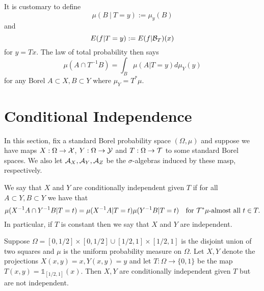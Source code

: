 \documentclass[twoside, a4paper, 10pt]{amsart}
\begin{document}
It is customary to define $$\mu(B ~|~ T = y) := \mu_y(B)$$ and $$E(f | T=y) := E(f|\mathcal{B}_T)(x)$$ for $y = Tx$. The law of total probability then says $$\mu(A \cap T^{-1}B) = \int_B \mu(A | T=y) d\mu_Y(y)  $$ for any Borel $A \subset X, B \subset Y$ where $\mu_Y = T^*\mu$.

\section{Conditional Independence}

In this section, fix a standard Borel probability space $(\Omega,\mu)$ and suppose we have maps $X:\Omega \to \mathcal{X}$, $Y:\Omega \to \mathcal{Y}$ and $T:\Omega \to \mathcal{T}$ to some standard Borel spaces. We also let $\mathcal{A}_X, \mathcal{A}_Y, \mathcal{A}_Z$ be the $\sigma$-algebras induced by these masp, respectively.

\begin{mydef} We say that $X$ and $Y$ are conditionally independent given $T$ if for all $A  \subset Y, B  \subset Y$ we have that $$\mu(X^{-1}A \cap Y^{-1}B |T=t) = \mu(X^{-1}A|T=t)\mu(Y^{-1}B|T=t) \quad\text{for $\mathcal{T}^*\mu$-almost all } t \in T.$$ In particular, if $T$ is constant then we say that $X$ and $Y$ are independent.

\end{mydef}

\begin{eg} Suppose $\Omega = [0,1/2] \times [0,1/2] \cup [1/2,1] \times [1/2,1]$ is the disjoint union of two squares and $\mu$ is the uniform probability measure on $\Omega$. Let $X,Y$ denote the projections $X(x,y)=x, Y(x,y)=y$ and let $T:\Omega \to \{0,1\}$ be the map $T(x,y) = \mathds{1}_{[1/2,1]} (x).$ Then $X,Y$ are conditionally independent given $T$ but are not independent.

\end{eg}
\end{document}
